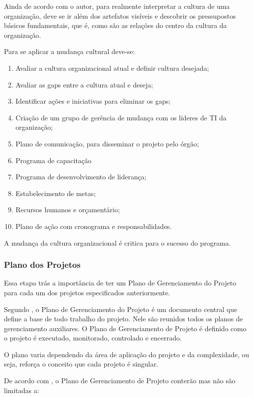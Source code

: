 Ainda de acordo com o autor, para realmente interpretar a cultura de uma organização, deve se ir além dos artefatos visíveis e descobrir os pressupostos básicos fundamentais, que é, como são as relações do centro da cultura da organização. 

Para se aplicar a mudança cultural deve-se:
\begin{enumerate}
\item Avaliar a cultura organizacional atual e definir cultura desejada;
\item Avaliar as gaps entre a cultura atual e deseja;
\item Identificar ações e iniciativas para eliminar os gaps; 
\item Criação de um grupo de gerência de mudança com os líderes de TI da organização;
\item Plano de comunicação, para disseminar o projeto pelo órgão;
\item Programa de capacitação
\item Programa de desenvolvimento de liderança;
\item Estabelecimento de metas;
\item Recursos humanos e orçamentário;
\item Plano de ação com cronograma e responsabilidades.
\end{enumerate}

 A mudança da cultura organizacional é critica para o sucesso do programa.

\subsubsection{Plano dos Projetos}

Essa etapa trás a importância de ter um Plano de Gerenciamento do Projeto para cada um dos projetos especificados anteriormente.

Segundo \cite{PMBOK/PMI:2013}, o Plano de Gerenciamento do Projeto é um documento central que define a base de todo trabalho do projeto. Nele são reunidos todos os planos de gerenciamento auxiliares. O Plano de Gerenciamento de Projeto é definido como o projeto é executado, monitorado, controlado e encerrado.

O plano varia dependendo da área de aplicação do projeto e da complexidade, ou seja, reforça o conceito que cada projeto é singular.

De acordo com \cite{ImplantandoGTI:2012}, o Plano de Gerenciamento de Projeto conterão mas não são limitadas a:

